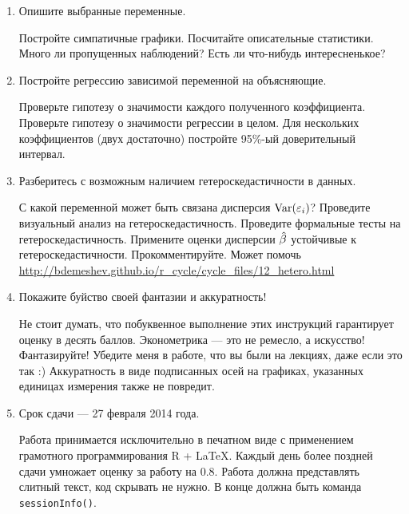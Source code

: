 \documentclass[12pt, a4paper]{article}
\begin{document}
\begin{enumerate}
\item Опишите выбранные переменные.

Постройте симпатичные графики. Посчитайте описательные статистики. Много ли пропущенных наблюдений? Есть ли что-нибудь интересненькое?

\item Постройте регрессию зависимой переменной на объясняющие.

Проверьте гипотезу о значимости каждого полученного коэффициента. Проверьте гипотезу о значимости регрессии в целом. Для нескольких коэффициентов (двух достаточно) постройте 95\%-ый доверительный интервал.

\item Разберитесь с возможным наличием гетероскедастичности в данных.

С какой переменной может быть связана дисперсия $\operatorname{Var}(\varepsilon_i)$? Проведите визуальный анализ на гетероскедастичность. Проведите формальные тесты на гетероскедастичность. Примените оценки дисперсии $\hat{\beta}$ устойчивые к гетероскедастичности. Прокомментируйте. Может помочь \url{http://bdemeshev.github.io/r_cycle/cycle_files/12_hetero.html}

\item Покажите буйство своей фантазии и аккуратность!

Не стоит думать, что побуквенное выполнение этих инструкций гарантирует оценку в десять баллов. Эконометрика — это не ремесло, а искусство! Фантазируйте! Убедите меня в работе, что вы были на лекциях, даже если это так :) Аккуратность в виде подписанных осей на графиках, указанных единицах измерения также не повредит.

\item Срок сдачи — 27 февраля 2014 года.

Работа принимается исключительно в печатном виде с применением грамотного программирования R + \LaTeX. Каждый день более поздней сдачи умножает оценку за работу на $0.8$.  Работа должна представлять слитный текст, код скрывать не нужно. В конце должна быть команда \verb|sessionInfo()|.





\end{enumerate}
\end{document}
